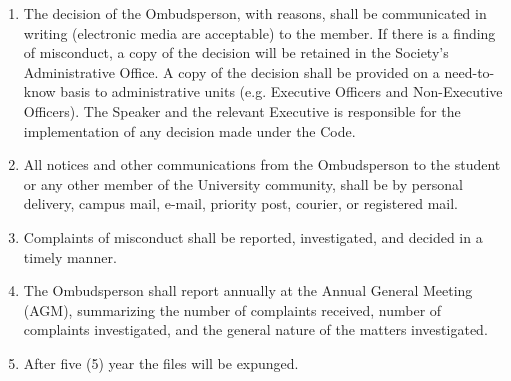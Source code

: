 \begin{enumerate} [align=left]
\item The decision of the Ombudsperson, with reasons, shall be communicated in writing (electronic media are acceptable) to the member. If there is a finding of misconduct, a copy of the decision will be retained in the Society's Administrative Office. A copy of the decision shall be provided on a need-to- know basis to administrative units (e.g. Executive Officers and Non-Executive Officers). The Speaker and the relevant Executive is responsible for the implementation of any decision made under the Code.
\item All notices and other communications from the Ombudsperson to the student or any other member of the University community, shall be by personal delivery, campus mail, e-mail, priority post, courier, or registered mail.
\item Complaints of misconduct shall be reported, investigated, and decided in a timely manner. 
\item The Ombudsperson shall report annually at the Annual General Meeting (AGM), summarizing the number of complaints received, number of complaints investigated, and the general nature of the matters investigated.
\item After five (5) year the files will be expunged.
\end{enumerate}

